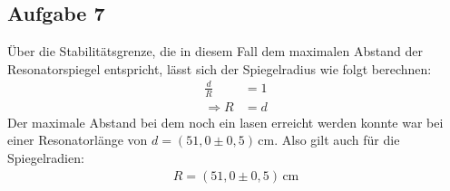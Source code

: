 \subsection{Aufgabe 7}
Über die Stabilitätsgrenze, die in diesem Fall dem maximalen Abstand der Resonatorspiegel entspricht, lässt sich der Spiegelradius wie folgt berechnen:
\begin{align}
\frac{d}{R} &= 1 \\
\Rightarrow R &= d
\end{align}
Der maximale Abstand bei dem noch ein lasen erreicht werden konnte war bei einer Resonatorlänge von $d = (51,0 \pm 0,5)\, \text{cm}$.
Also gilt auch für die Spiegelradien:
\begin{align}
R = (51,0 \pm 0,5)\, \text{cm}
\end{align}
